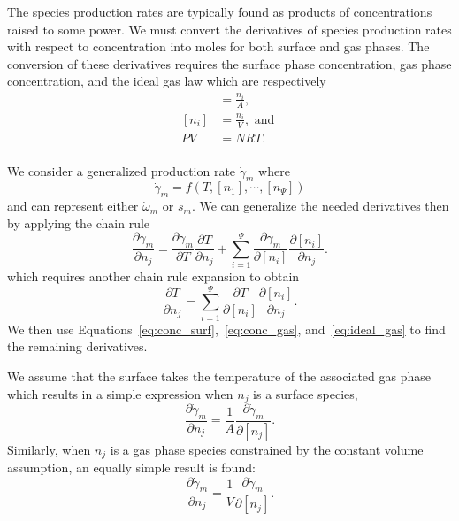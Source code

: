 \documentclass[12pt]{ussci}
\def\nspecies{\Psi}
\begin{document}
The species production rates are typically found as products of concentrations raised to some power.
We must convert the derivatives of species production rates with respect to concentration into moles for both surface and gas phases.
The conversion of these derivatives requires the surface phase concentration, gas phase concentration, and the ideal gas law which are respectively
\begin{align}
    [n_i] &= \frac{n_i}{A},\label{eq:conc_surf}\\
    [n_i] &= \frac{n_i}{V}, \text{ and }\label{eq:conc_gas}\\
    P V &= N R T.\label{eq:ideal_gas}\\
\end{align}

We consider a generalized production rate $\dot{\gamma}_m$ where
\begin{equation}
    \dot{\gamma}_m = f(T, [n_1], \cdots, [n_\nspecies])
\end{equation}
and can represent either $\dot{\omega}_m$ or $\dot{s}_m$.
We can generalize the needed derivatives then by applying the chain rule
\begin{equation}
    \label{eq:gen_deriv}
    \frac{\partial \dot{\gamma}_m}{\partial n_j} = \frac{\partial \dot{\gamma}_m}{\partial T}\frac{\partial T}{\partial n_j} + \sum_{i=1}^{\nspecies}{\frac{\partial \dot{\gamma}_m}{\partial [n_i]}\frac{\partial[n_i]}{\partial n_j}}.
\end{equation}
which requires another chain rule expansion to obtain
\begin{equation}
    \frac{\partial T}{\partial n_j} = \sum_{i=1}^{\nspecies}{\frac{\partial T}{\partial [n_i]}\frac{\partial [n_i]}{\partial n_j}}.
\end{equation}
We then use Equations~\ref{eq:conc_surf},~\ref{eq:conc_gas}, and~\ref{eq:ideal_gas} to find the remaining derivatives.

We assume that the surface takes the temperature of the associated gas phase which
results in a simple expression when $n_j$ is a surface species,
\begin{equation}
    \frac{\partial \dot{\gamma}_m}{\partial n_j} =  \frac{1}{A}\frac{\partial \dot{\gamma}_m}{\partial [n_j]}.
\end{equation}
Similarly, when $n_j$ is a gas phase species constrained by the constant volume assumption, an equally simple result is found:
\begin{equation}
    \frac{\partial \dot{\gamma}_m}{\partial n_j} =  \frac{1}{V}\frac{\partial \dot{\gamma}_m}{\partial [n_j]}.
\end{equation}
\end{document}
